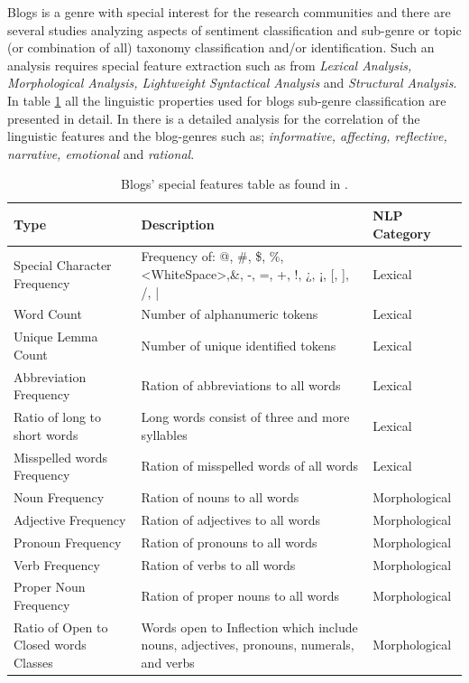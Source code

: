 Blogs is a genre with special interest for the research communities and there are several studies analyzing aspects of sentiment classification and sub-genre or topic (or combination of all) taxonomy classification and/or identification. Such an analysis requires special feature extraction such as from\textit{ Lexical Analysis, Morphological Analysis, Lightweight Syntactical Analysis} and \textit{Structural Analysis}. In table \ref{chap:relevant_work:tbl:blogs_special_features} all the linguistic properties used for blogs sub-genre classification are presented in detail. In \parencite{virik2017blog} there is a detailed analysis for the correlation of the linguistic features and the blog-genres such as; \textit{informative, affecting, reflective, narrative, emotional} and \textit{rational}.

\begin{table}[t]
	\center
	\caption {Blogs' special features table as found in \parencite{virik2017blog}.}\label{chap:relevant_work:tbl:blogs_special_features}
	\begin{tabular}{p{4cm}p{7cm}p{3cm}}
		\hline
		Type & Description & NLP Category \\
		\hline
		Special Character Frequency & Frequency of: @, \#, \$, \%, <WhiteSpace>,\&, -, =, +, !,  ¿, ¡, [, ], /, | & Lexical \\
		Word Count & Number of alphanumeric tokens & Lexical \\
        Unique Lemma Count & Number of unique identified tokens & Lexical \\
        Abbreviation Frequency & Ration of abbreviations to all words & Lexical \\
        Ratio of long to short words & Long words consist of three and more syllables & Lexical \\
        Misspelled words Frequency & Ration of misspelled words of all words & Lexical\\
		Noun Frequency & Ration of nouns to all words & Morphological \\
        Adjective Frequency & Ration of adjectives to all words & Morphological \\
        Pronoun Frequency & Ration of pronouns to all words & Morphological \\
        Verb Frequency & Ration of verbs to all words & Morphological \\
        Proper Noun Frequency & Ration of proper nouns to all words & Morphological \\
        Ratio of Open to Closed words Classes & Words open to Inflection which include nouns, adjectives, pronouns, numerals, and verbs  & Morphological \\

\end{tabular}
\end{table}
